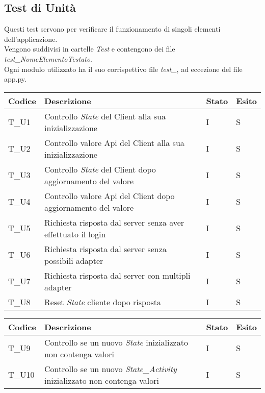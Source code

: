 \subsection{Test di Unità}
Questi test servono per verificare il funzionamento di singoli elementi dell'applicazione.  \\
Vengono suddivisi in cartelle \textit{Test} e contengono dei file \textit{test\_NomeElementoTestato}. \\
Ogni modulo utilizzato ha il suo corrispettivo file \textit{test\_}, ad eccezione del file app.py.
\begin{center}
  \renewcommand{\arraystretch}{1.8}
  \begin{tabular}{ |m{3em}|m{23em}|m{3em}|m{3em}| }
      \hline
      \textbf{Codice} & \textbf{Descrizione}  & \textbf{Stato} & \textbf{Esito}\\
      \hline
      T\_U1 & Controllo \textit{State} del Client alla sua inizializzazione & I & S \\
      \hline
      T\_U2 & Controllo valore Api del Client alla sua inizializzazione & I & S \\
      \hline
      T\_U3 & Controllo \textit{State} del Client dopo aggiornamento del valore & I & S \\
      \hline
      T\_U4 & Controllo valore Api del Client dopo aggiornamento del valore & I & S \\
      \hline
      T\_U5 & Richiesta risposta dal server senza aver effettuato il login & I & S \\
      \hline
      T\_U6 & Richiesta risposta dal server senza possibili adapter & I & S \\
      \hline
      T\_U7 & Richiesta risposta dal server con multipli adapter & I & S \\
      \hline
      T\_U8 & Reset \textit{State} cliente dopo risposta & I & S \\
      \hline
  \end{tabular}
  \newpage
  \begin{tabular}{ |m{3em}|m{23em}|m{3em}|m{3em}| }
    \hline
    \textbf{Codice} & \textbf{Descrizione}  & \textbf{Stato} & \textbf{Esito}\\
    \hline
      T\_U9 & Controllo se un nuovo \textit{State} inizializzato non contenga valori  & I & S \\
      \hline
      T\_U10 & Controllo se un nuovo \textit{State\_Activity} inizializzato non contenga valori  & I & S\\
      \hline

\end{tabular}
\end{center}
